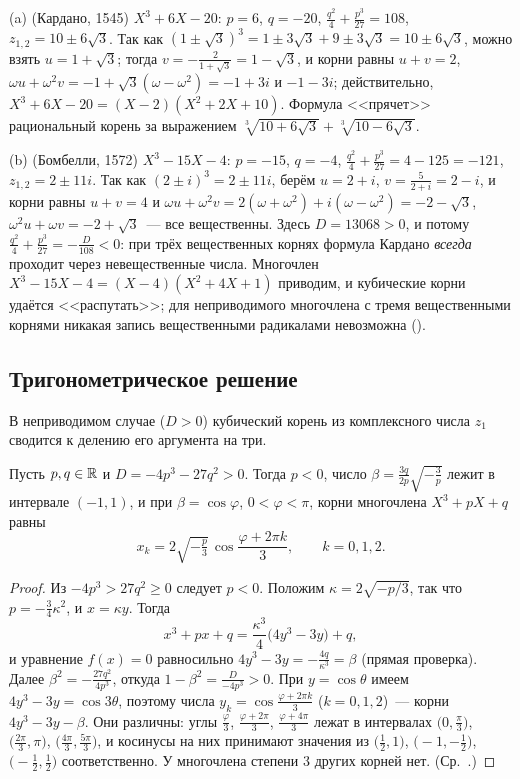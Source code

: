 \begin{example}[4.7f]
(a) (Кардано, 1545) $X^3+6X-20$: $p=6$, $q=-20$, $\frac{q^2}4+\frac{p^3}{27}=108$, $z_{1,2}=10\pm6\sqrt3$. Так как
$(1\pm\sqrt3)^3=1\pm3\sqrt3+9\pm3\sqrt3=10\pm6\sqrt3$, можно взять $u=1+\sqrt3$; тогда $v=-\frac{2}{1+\sqrt3}=1-\sqrt3$, и корни равны
$u+v=2$, $\omega u+\omega^2v=-1+\sqrt3(\omega-\omega^2)=-1+3i$ и $-1-3i$; действительно, $X^3+6X-20=(X-2)(X^2+2X+10)$. Формула
<<прячет>> рациональный корень за выражением $\sqrt[3]{10+6\sqrt3}+\sqrt[3]{10-6\sqrt3}$.

(b) (Бомбелли, 1572) $X^3-15X-4$: $p=-15$, $q=-4$, $\frac{q^2}4+\frac{p^3}{27}=4-125=-121$, $z_{1,2}=2\pm11i$. Так как
$(2\pm i)^3=2\pm11i$, берём $u=2+i$, $v=\frac5{2+i}=2-i$, и корни равны $u+v=4$ и
$\omega u+\omega^2v=2(\omega+\omega^2)+i(\omega-\omega^2)=-2-\sqrt3$, $\omega^2u+\omega v=-2+\sqrt3$~--- все вещественны. Здесь
$D=13068>0$, и потому $\frac{q^2}4+\frac{p^3}{27}=-\frac D{108}<0$: при трёх вещественных корнях формула Кардано \emph{всегда}
проходит через невещественные числа. Многочлен $X^3-15X-4=(X-4)(X^2+4X+1)$ приводим, и кубические корни удаётся
<<распутать>>; для неприводимого многочлена с тремя вещественными корнями никакая запись вещественными радикалами
невозможна ().
\end{example}

\subsection*{Тригонометрическое решение}

В неприводимом случае ($D>0$) кубический корень из комплексного числа $z_1$ сводится к делению его аргумента на три.

\begin{proposition}[4.7g]
Пусть $p,q\in\mathbb R$ и $D=-4p^3-27q^2>0$. Тогда $p<0$, число $\beta=\frac{3q}{2p}\sqrt{-\frac3p}$ лежит в интервале $(-1,1)$, и при
$\beta=\cos\varphi$, $0<\varphi<\pi$, корни многочлена $X^3+pX+q$ равны
\[
x_k=2\sqrt{-\tfrac p3}\,\cos\frac{\varphi+2\pi k}3,\qquad k=0,1,2 .
\]
\end{proposition}

\begin{proof}
Из $-4p^3>27q^2\ge0$ следует $p<0$. Положим $\kappa=2\sqrt{-p/3}$, так что $p=-\frac34\kappa^2$, и $x=\kappa y$. Тогда
\[
x^3+px+q=\frac{\kappa^3}4\bigl(4y^3-3y\bigr)+q,
\]
и уравнение $f(x)=0$ равносильно $4y^3-3y=-\frac{4q}{\kappa^3}=\beta$ (прямая проверка). Далее $\beta^2=-\frac{27q^2}{4p^3}$, откуда
$1-\beta^2=\frac{D}{-4p^3}>0$. При $y=\cos\theta$ имеем $4y^3-3y=\cos3\theta$, поэтому числа $y_k=\cos\frac{\varphi+2\pi k}3$ ($k=0,1,2$)~---
корни $4y^3-3y-\beta$. Они различны: углы $\frac\varphi3$, $\frac{\varphi+2\pi}3$, $\frac{\varphi+4\pi}3$ лежат в интервалах $\bigl(0,\frac\pi3\bigr)$,
$\bigl(\frac{2\pi}3,\pi\bigr)$, $\bigl(\frac{4\pi}3,\frac{5\pi}3\bigr)$, и косинусы на них принимают значения из $\bigl(\frac12,1\bigr)$, $\bigl(-1,-\frac12\bigr)$,
$\bigl(-\frac12,\frac12\bigr)$ соответственно. У многочлена степени $3$ других корней нет. (Ср.\ .)
\end{proof}

